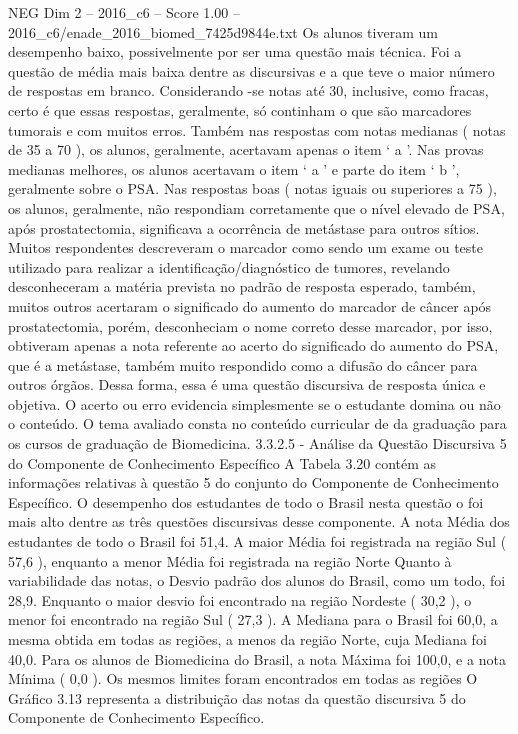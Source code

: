 \begin{textsample}{NEG Dim 2 – 2016\_c6 – Score 1.00 – 2016\_c6/enade\_2016\_biomed\_7425d9844e.txt}
Os alunos tiveram um desempenho baixo, possivelmente por ser uma questão mais técnica.
Foi a questão de média mais baixa dentre as discursivas e a que teve o maior número de respostas em branco.
Considerando -se notas até 30, inclusive, como fracas, certo é que essas respostas, geralmente, só continham o que são marcadores tumorais e com muitos erros.
Também nas respostas com notas medianas ( notas de 35 a 70 ), os alunos, geralmente, acertavam apenas o item ‘ a ’.
Nas provas medianas melhores, os alunos acertavam o item ‘ a ’ e parte do item ‘ b ’, geralmente sobre o PSA.
Nas respostas boas ( notas iguais ou superiores a 75 ), os alunos, geralmente, não respondiam corretamente que o nível elevado de PSA, após prostatectomia, significava a ocorrência de metástase para outros sítios.
Muitos respondentes descreveram o marcador como sendo um exame ou teste utilizado para realizar a identificação/diagnóstico de tumores, revelando desconheceram a matéria prevista no padrão de resposta esperado, também, muitos outros acertaram o significado do aumento do marcador de câncer após prostatectomia, porém, desconheciam o nome correto desse marcador, por isso, obtiveram apenas a nota referente ao acerto do significado do aumento do PSA, que é a metástase, também muito respondido como a difusão do câncer para outros órgãos.
Dessa forma, essa é uma questão discursiva de resposta única e objetiva.
O acerto ou erro evidencia simplesmente se o estudante domina ou não o conteúdo.
O tema avaliado consta no conteúdo curricular de da graduação para os cursos de graduação de Biomedicina. 3.3.2.5 - Análise da Questão Discursiva 5 do Componente de Conhecimento Específico A Tabela 3.20 contém as informações relativas à questão 5 do conjunto do Componente de Conhecimento Específico.
O desempenho dos estudantes de todo o Brasil nesta questão o foi mais alto dentre as três questões discursivas desse componente.
A nota Média dos estudantes de todo o Brasil foi 51,4.
A maior Média foi registrada na região Sul ( 57,6 ), enquanto a menor Média foi registrada na região Norte Quanto à variabilidade das notas, o Desvio padrão dos alunos do Brasil, como um todo, foi 28,9.
Enquanto o maior desvio foi encontrado na região Nordeste ( 30,2 ), o menor foi encontrado na região Sul ( 27,3 ).
A Mediana para o Brasil foi 60,0, a mesma obtida em todas as regiões, a menos da região Norte, cuja Mediana foi 40,0.
Para os alunos de Biomedicina do Brasil, a nota Máxima foi 100,0, e a nota Mínima ( 0,0 ).
Os mesmos limites foram encontrados em todas as regiões O Gráfico 3.13 representa a distribuição das notas da questão discursiva 5 do Componente de Conhecimento Específico.

\end{textsample}
